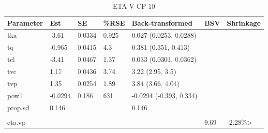 \begin{table}
\centering\centering
\caption{ETA V CP 10}
\centering
\fontsize{8}{10}\selectfont
\begin{tabular}[t]{lllllll}
\toprule
\textbf{Parameter} & \textbf{Est} & \textbf{SE} & \textbf{\%RSE} & \textbf{Back-transformed} & \textbf{BSV} & \textbf{Shrinkage}\\
\midrule
tka & -3.61 & 0.0334 & 0.925 & 0.027 (0.0253, 0.0288) &  & \\
\midrule
tq & -0.965 & 0.0415 & 4.3 & 0.381 (0.351, 0.413) &  & \\
\midrule
tcl & -3.41 & 0.0467 & 1.37 & 0.033 (0.0301, 0.0362) &  & \\
\midrule
tvc & 1.17 & 0.0436 & 3.74 & 3.22 (2.95, 3.5) &  & \\
\midrule
tvp & 1.35 & 0.0254 & 1.89 & 3.84 (3.66, 4.04) &  & \\
\midrule
pow1 & -0.0294 & 0.186 & 631 & -0.0294 (-0.393, 0.334) &  & \\
\midrule
prop.sd & 0.146 &  &  & 0.146 &  & \\
\midrule\\
eta.vp &  &  &  &  & 9.69 & -2.28\%>\\
\bottomrule
\end{tabular}
\end{table}